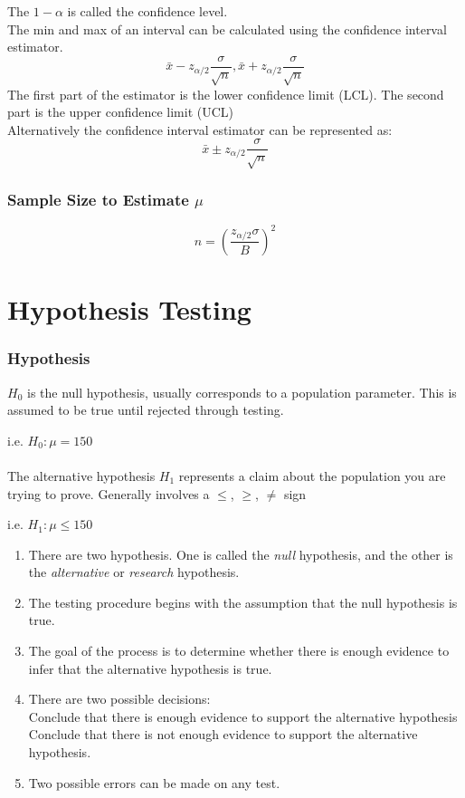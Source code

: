 \documentclass{article}
\begin{document}
The  $1 - \alpha$  is called the confidence level.
\\

The min and max of an interval can be calculated using the confidence interval estimator.
$$
\bar{x} - z_{\alpha / 2}\frac{\sigma}{\sqrt{n}}, \bar{x} + z_{\alpha / 2}\frac{\sigma}{\sqrt{n}}
$$
The first part of the estimator is the lower confidence limit (LCL). The second part is the upper confidence limit (UCL)
\\

Alternatively the confidence interval estimator can be represented as:
$$
\bar{x} \pm z_{\alpha / 2}\frac{\sigma}{\sqrt{n}}
$$


\subsubsection{Sample Size to Estimate $\mu$}

$$
n = (\frac{z_{\alpha / 2} \sigma}{B})^2
$$

\section{Hypothesis Testing}

\subsubsection{Hypothesis}
$H_0$ is the null hypothesis, usually corresponds to a population parameter. This is assumed to be true until rejected through testing.

i.e. $H_0 : \mu = 150$
\\
\\
The alternative hypothesis $H_1$ represents a claim about the population you are trying to prove. Generally involves a $\leq$, $\geq$, $\neq$ sign

i.e. $H_1 : \mu \leq 150$

\begin{enumerate}
\item There are two hypothesis. One is called the \textit{null} hypothesis, and the other is the \textit{alternative} or \textit{research} hypothesis.
\item The testing procedure begins with the assumption that the null hypothesis is true.
\item The goal of the process is to determine whether there is enough evidence to infer that the alternative hypothesis is true.
\item There are two possible decisions:\\
	Conclude that there is enough evidence to support the alternative hypothesis\\
	Conclude that there is not enough evidence to support the alternative hypothesis.
\item Two possible errors can be made on any test.
\end{enumerate}
\end{document}
